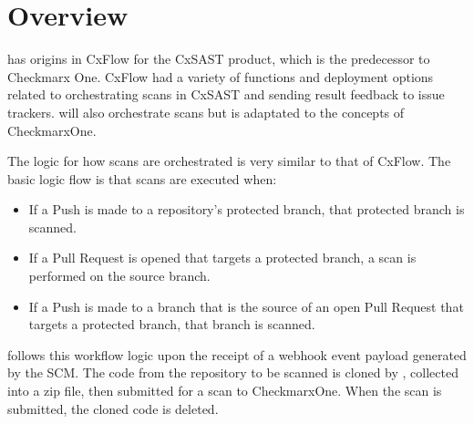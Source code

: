 \chapter{Overview}\label{sec:overview}

\cxoneflow has origins in CxFlow for the CxSAST product, which is the predecessor to Checkmarx One.  CxFlow
had a variety of functions and deployment options related to orchestrating scans in CxSAST and sending
result feedback to issue trackers.  \cxoneflow will also orchestrate scans but is adaptated to the
concepts of CheckmarxOne.

The \cxoneflow logic for how scans are orchestrated is very similar to that of CxFlow.  The basic
logic flow is that scans are executed when:

\begin{itemize}
    \item If a Push is made to a repository's protected branch, that protected branch is scanned.
    \item If a Pull Request is opened that targets a protected branch, a scan is performed on
    the source branch.
    \item If a Push is made to a branch that is the source of an open Pull Request that targets
    a protected branch, that branch is scanned.
\end{itemize}


\cxoneflow follows this workflow logic upon the receipt of a webhook event payload generated by the SCM.
The code from the repository to be scanned is cloned by \cxoneflow, collected into a zip file, then submitted
for a scan to CheckmarxOne.  When the scan is submitted, the cloned code is deleted.

